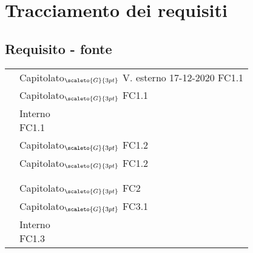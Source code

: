 {{{{\section{Tracciamento dei requisiti}\label{RequisitiTracciamentoDeiRequisiti}

\subsection{Requisito - fonte}\label{RequisitiTracciamentoDeiRequisitiFonte}

\def\tabularxcolumn#1{m{#1}}
{
	\begin{center}
		\renewcommand{\arraystretch}{1.4}
		\begin{longtable}{|p{7.5cm}|p{7.5cm}|}
		\hline
		\rowcolor{airforceblue}
		\makecell[tc]{\textbf{Codice RS}} & \makecell[c]{\textbf{Fonte}}  \\
		\hline
		\makecell[tc]{RSFO1} & \makecell[tc]{Capitolato$_{\scaleto{G}{3pt}}$\\V. esterno 17-12-2020 \\ FC1.1} \\
		\hline
		\makecell[tc]{RSFF2} & \makecell[tc]{Capitolato$_{\scaleto{G}{3pt}}$ \\ FC1.1}\\
		\hline
		\makecell[tc]{RSFO3} & \makecell[tc]{Interno\\FC1.1}\\
		\hline
		\makecell[tc]{RSFO4.1} & \makecell[tc]{Capitolato$_{\scaleto{G}{3pt}}$\\FC1.2}\\
		\hline
		\makecell[tc]{RSFO4.2} & \makecell[tc]{Capitolato$_{\scaleto{G}{3pt}}$\\FC1.2}\\
		\hline
		\makecell[tc]{RSFO5} & \makecell[tc]{Capitolato$_{\scaleto{G}{3pt}}$}\\
		\hline
		\makecell[tc]{RSFO5.1} & \makecell[tc]{Capitolato$_{\scaleto{G}{3pt}}$}\\
		\hline
		\makecell[tc]{RSFD6 }& \makecell[tc]{Capitolato$_{\scaleto{G}{3pt}}$ \\ FC2}\\
		\hline
		\makecell[tc]{RSFO7} & \makecell[tc]{Capitolato$_{\scaleto{G}{3pt}}$\\FC3.1}\\
		\hline
		\makecell[tc]{RSFO8} & \makecell[tc]{Interno \\FC1.3}\\

\end{longtable}
\end{center}}}}}}
